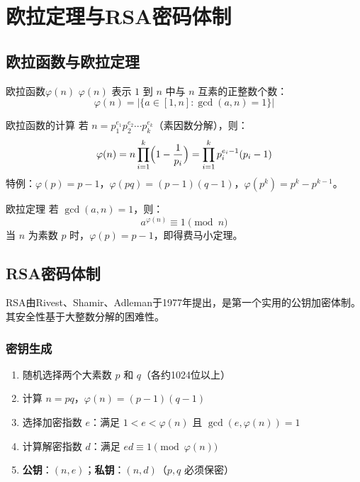 \section{欧拉定理与RSA密码体制}

\subsection{欧拉函数与欧拉定理}

\begin{mydefinition}{欧拉函数\(\varphi(n)\)}
\(\varphi(n)\) 表示 \(1\) 到 \(n\) 中与 \(n\) 互素的正整数个数：
\[
\varphi(n) = |\{ a\in[1,n] : \gcd(a,n)=1 \}|
\]
\end{mydefinition}

\begin{myTheorem}{欧拉函数的计算}
若 \(n=p_1^{e_1}p_2^{e_2}\cdots p_k^{e_k}\)（素因数分解），则：
\[
\varphi(n) = n\prod_{i=1}^{k}\Bigl(1-\frac{1}{p_i}\Bigr) = \prod_{i=1}^{k} p_i^{e_i-1}(p_i-1)
\]
特例：\(\varphi(p)=p-1\)，\(\varphi(pq)=(p-1)(q-1)\)，\(\varphi(p^k)=p^k-p^{k-1}\)。
\end{myTheorem}

\begin{myTheorem}{欧拉定理}
若 \(\gcd(a,n)=1\)，则：
\[
a^{\varphi(n)} \equiv 1 \pmod{n}
\]
当 \(n\) 为素数 \(p\) 时，\(\varphi(p)=p-1\)，即得费马小定理。
\end{myTheorem}

\subsection{RSA密码体制}

RSA由Rivest、Shamir、Adleman于1977年提出，是第一个实用的公钥加密体制。其安全性基于大整数分解的困难性。

\subsubsection{密钥生成}

\begin{enumerate}
    \item 随机选择两个大素数 \(p\) 和 \(q\)（各约1024位以上）
    \item 计算 \(n=pq\)，\(\varphi(n)=(p-1)(q-1)\)
    \item 选择加密指数 \(e\)：满足 \(1<e<\varphi(n)\) 且 \(\gcd(e,\varphi(n))=1\)
    \item 计算解密指数 \(d\)：满足 \(ed\equiv1\pmod{\varphi(n)}\)
    \item \textbf{公钥}：\((n,e)\)；\textbf{私钥}：\((n,d)\)（\(p,q\) 必须保密）
\end{enumerate}

